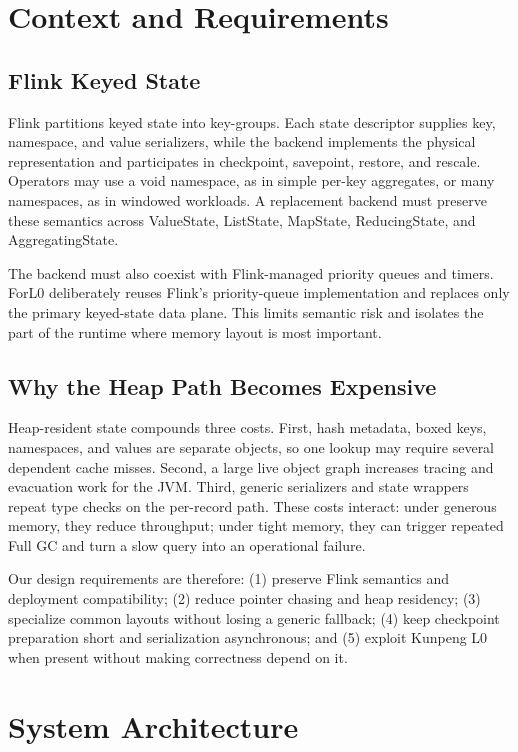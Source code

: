 \documentclass[sigconf]{acmart}
\newcommand{\forlzero}{ForL0\xspace}
\newcommand{\system}{\forlzero}
\begin{document}
\section{Context and Requirements}

\subsection{Flink Keyed State}

Flink partitions keyed state into key-groups. Each state descriptor supplies key, namespace, and value serializers, while the backend implements the physical representation and participates in checkpoint, savepoint, restore, and rescale. Operators may use a void namespace, as in simple per-key aggregates, or many namespaces, as in windowed workloads. A replacement backend must preserve these semantics across ValueState, ListState, MapState, ReducingState, and AggregatingState.

The backend must also coexist with Flink-managed priority queues and timers. \system deliberately reuses Flink's priority-queue implementation and replaces only the primary keyed-state data plane. This limits semantic risk and isolates the part of the runtime where memory layout is most important.

\subsection{Why the Heap Path Becomes Expensive}

Heap-resident state compounds three costs. First, hash metadata, boxed keys, namespaces, and values are separate objects, so one lookup may require several dependent cache misses. Second, a large live object graph increases tracing and evacuation work for the JVM. Third, generic serializers and state wrappers repeat type checks on the per-record path. These costs interact: under generous memory, they reduce throughput; under tight memory, they can trigger repeated Full GC and turn a slow query into an operational failure.

Our design requirements are therefore: (1) preserve Flink semantics and deployment compatibility; (2) reduce pointer chasing and heap residency; (3) specialize common layouts without losing a generic fallback; (4) keep checkpoint preparation short and serialization asynchronous; and (5) exploit Kunpeng L0 when present without making correctness depend on it.

\section{System Architecture}
\end{document}
